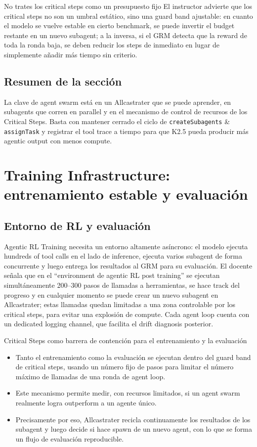 \documentclass[a4paper]{article}
\begin{document}
\begin{warningbox}{No trates los critical steps como un presupuesto fijo}
El instructor advierte que los critical steps no son un umbral estático, sino una guard band ajustable: en cuanto el modelo se vuelve estable en cierto benchmark, se puede invertir el budget restante en un nuevo subagent; a la inversa, si el GRM detecta que la reward de toda la ronda baja, se deben reducir los steps de inmediato en lugar de simplemente añadir más tiempo sin criterio.
\end{warningbox}

\subsection{Resumen de la sección}
La clave de agent swarm está en un Allcastrater que se puede aprender, en subagents que corren en parallel y en el mecanismo de control de recursos de los Critical Steps. Basta con mantener cerrado el ciclo de \texttt{createSubagents} \& \texttt{assignTask} y registrar el tool trace a tiempo para que K2.5 pueda producir más agentic output con menos compute.
\section{Training Infrastructure: entrenamiento estable y evaluación}

\subsection{Entorno de RL y evaluación}
Agentic RL Training necesita un entorno altamente asíncrono: el modelo ejecuta hundreds of tool calls en el lado de inference, ejecuta varios subagent de forma concurrente y luego entrega los resultados al GRM para su evaluación. El docente señala que en el ``environment de agentic RL post training'' se ejecutan simultáneamente 200--300 pasos de llamadas a herramientas, se hace track del progreso y en cualquier momento se puede crear un nuevo subagent en Allcastrater; estas llamadas quedan limitadas a una zona controlable por los critical steps, para evitar una explosión de compute. Cada agent loop cuenta con un dedicated logging channel, que facilita el drift diagnosis posterior.

\begin{knowledgebox}{Critical Steps como barrera de contención para el entrenamiento y la evaluación}
\begin{itemize}
    \item Tanto el entrenamiento como la evaluación se ejecutan dentro del guard band de critical steps, usando un número fijo de pasos para limitar el número máximo de llamadas de una ronda de agent loop.
    \item Este mecanismo permite medir, con recursos limitados, si un agent swarm realmente logra outperform a un agente único.
    \item Precisamente por eso, Allcastrater recicla continuamente los resultados de los subagent y luego decide si hace spawn de un nuevo agent, con lo que se forma un flujo de evaluación reproducible.
\end{itemize}
\end{knowledgebox}
\end{document}

